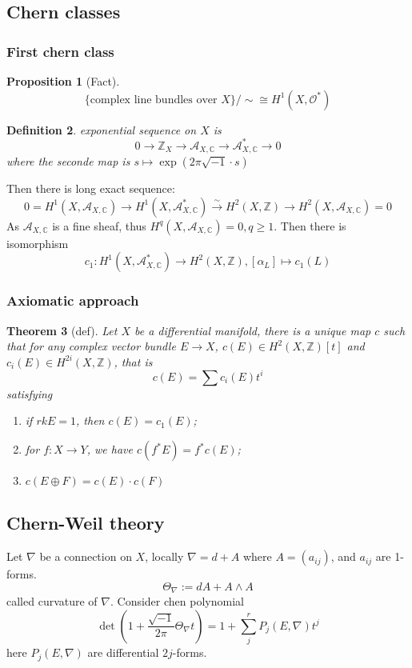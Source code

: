 \documentclass{article}
\newtheorem{definition}{Definition}[subsection]
\newtheorem{proposition}[definition]{Proposition}
\newtheorem{theorem}[definition]{Theorem}
\begin{document}
\subsection{Chern classes}
\subsubsection{First chern class}
\begin{proposition}[Fact]
  \[
    \{ \text{complex line bundles over }X \}/\sim \cong H^{1}(X,\mathcal{O}^{*})
  \]
\end{proposition}
\begin{definition}
  exponential sequence on $X$ is
  \[
    0 \to \mathbb{Z}_{X} \to \mathcal{A}_{X,\mathbb{C}}\to \mathcal{A}_{X,\mathbb{C}}^{*}\to 0
  \]
  where the seconde map is $ s \mapsto \exp(2\pi\sqrt{-1}\cdot s) $ 
\end{definition}
Then there is long exact sequence:
\[
  0=H^{1}(X,\mathcal{A}_{X,\mathbb{C}}) \to H^{1}(X,\mathcal{A}_{X,\mathbb{C}}^{*}) \xrightarrow{\sim} H^{2}(X,\mathbb{Z})\to H^{2}(X,\mathcal{A}_{X,\mathbb{C}})=0
\]
As $\mathcal{A}_{X,\mathbb{C}}$ is a fine sheaf, thus $ H^{q}(X,\mathcal{A}_{X,\mathbb{C}})=0,q\geqslant 1 $. Then there is isomorphism
\[
  c_{1}:H^{1}(X,\mathcal{A}_{X,\mathbb{C}}^{*}) \to H^{2}(X,\mathbb{Z}), [\alpha_{L}] \mapsto c_{1}(L)
\]
\subsubsection{Axiomatic approach}
\begin{theorem}[def]
  Let $X$ be a differential manifold, there is a unique map $c$ such that for any complex vector bundle $E\to X$, $c(E)\in H^{2}(X,\mathbb{Z})[t]$ and $ c_{i}(E)\in H^{2i}(X,\mathbb{Z}) $, that is
  \[
    c(E)=\sum c_{i}(E)t^{i}
  \]
  satisfying
  \begin{enumerate}
    \item if $ rk E = 1 $, then $ c(E)=c_{1}(E) $;
    \item for $ f:X\to Y $, we have $ c(f^{*}E)=f^{*}c(E) $;
    \item $ c(E \oplus F) = c(E) \cdot c(F) $
  \end{enumerate}
\end{theorem}

\subsection{Chern-Weil theory}
Let $ \nabla $ be a connection on $X$, locally $ \nabla = d + A $ where $A=(a_{ij})$, and  $a_{ij}$ are 1-forms.   
\[
  \Theta_{\nabla}:=dA+A\wedge A
\]
called curvature of $ \nabla $. Consider chen polynomial
\[
  \det(1+ \frac{\sqrt{-1}}{2\pi}\Theta_{\nabla}t)=1+\sum_{j}^{r}P_{j}(E,\nabla)t^{j}
\]
here $P_{j}(E,\nabla)$ are differential $ 2j $-forms.
\end{document}
